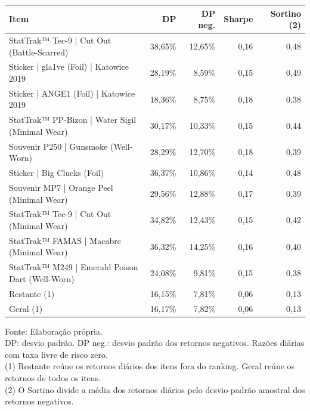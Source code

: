 \begingroup
\setlength{}
\setlength{}
\fontsize{10.0pt}{12.0pt}\selectfont

\setlength{\LTpost}{0mm}
\begin{longtable}{@{\extracolsep{\fill}}lrrrr}

\toprule
\textbf{Item} & \textbf{DP} & \textbf{DP neg.} & \textbf{Sharpe} & \textbf{Sortino} (2) \\ 
\midrule\addlinespace[2.5pt]
StatTrak™ Tec-9 | Cut Out (Battle-Scarred) & 38,65\% & 12,65\% & 0,16 & 0,48 \\
Sticker | gla1ve (Foil) | Katowice 2019 & 28,19\% & 8,59\% & 0,15 & 0,49 \\
Sticker | ANGE1 (Foil) | Katowice 2019 & 18,36\% & 8,75\% & 0,18 & 0,38 \\
StatTrak™ PP-Bizon | Water Sigil (Minimal Wear) & 30,17\% & 10,33\% & 0,15 & 0,44 \\
Souvenir P250 | Gunsmoke (Well-Worn) & 28,29\% & 12,70\% & 0,18 & 0,39 \\
Sticker | Big Clucks (Foil) & 36,37\% & 10,86\% & 0,14 & 0,48 \\
Souvenir MP7 | Orange Peel (Minimal Wear) & 29,56\% & 12,88\% & 0,17 & 0,39 \\
StatTrak™ Tec-9 | Cut Out (Minimal Wear) & 34,82\% & 12,43\% & 0,15 & 0,42 \\
StatTrak™ FAMAS | Macabre (Minimal Wear) & 36,32\% & 14,25\% & 0,16 & 0,40 \\
StatTrak™ M249 | Emerald Poison Dart (Well-Worn) & 24,08\% & 9,81\% & 0,15 & 0,38 \\
Restante (1) & 16,15\% & 7,81\% & 0,06 & 0,13 \\
Geral (1) & 16,17\% & 7,82\% & 0,06 & 0,13 \\
\bottomrule
\end{longtable}
\begin{minipage}{\linewidth}
Fonte: Elaboração própria.\\
DP: desvio padrão. DP neg.: desvio padrão dos retornos negativos. Razões diárias com taxa livre de risco zero.\\
(1) Restante reúne os retornos diários dos itens fora do ranking. Geral reúne os retornos de todos os itens.\\
(2) O Sortino divide a média dos retornos diários pelo desvio-padrão amostral dos retornos negativos.\\
\end{minipage}
\endgroup
